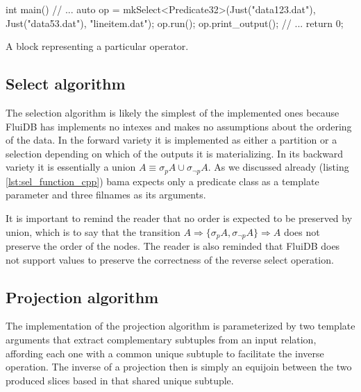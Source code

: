 \begin{code}
\begin{cppcode}
int main() {
  // ...
  {
    auto op = mkSelect<Predicate32>(Just("data123.dat"), Just("data53.dat"),
                                    "lineitem.dat");
    op.run();
    op.print_output();
  }
  // ...
  return 0;
}
\end{cppcode}
  \caption{\label{lst:gen_out_code}A block representing a particular
    operator.}
\end{code}


\subsection{Select algorithm}

The selection algorithm is likely the simplest of the implemented ones
because FluiDB has implements no intexes and makes no assumptions
about the ordering of the data. In the forward variety it is
implemented as either a partition or a selection depending on which of
the outputs it is materializing. In its backward variety it is
essentially a union \(A \equiv \sigma_p A \cup \sigma_{\neg p} A\). As
we discussed already (listing \ref{lst:sel_function_cpp}) bama expects
only a predicate class as a template parameter and three filnames as
its arguments.

It is important to remind the reader that no order is expected to be
preserved by union, which is to say that the transition \(A
\Rightarrow \{\sigma_p A, \sigma_{\neg p} A\} \Rightarrow A\) does not
preserve the order of the nodes. The reader is also reminded that
FluiDB does not support  values to preserve the correctness of
the reverse select operation.


\subsection{Projection algorithm}
\label{sec:projection_algorithm}

The implementation of the projection algorithm is parameterized by two
template arguments that extract complementary subtuples from an input
relation, affording each one with a common unique subtuple to
facilitate the inverse operation. The inverse of a projection then is
simply an equijoin between the two produced slices based in that
shared unique subtuple.

